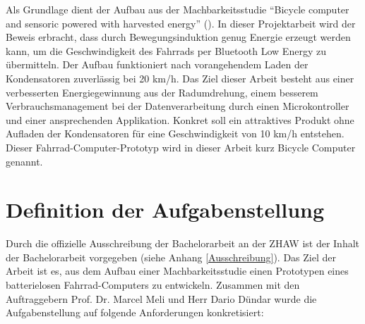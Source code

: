 Als Grundlage dient der Aufbau aus der Machbarkeitsstudie ``Bicycle computer and sensoric powered with harvested energy'' (\cite{PA_bicycle}). In dieser Projektarbeit wird der Beweis erbracht, dass durch Bewegungsinduktion genug Energie erzeugt werden kann, um die Geschwindigkeit des Fahrrads per Bluetooth Low Energy zu übermitteln. Der Aufbau funktioniert nach vorangehendem Laden der Kondensatoren zuverlässig bei 20 km/h. Das Ziel dieser Arbeit besteht aus einer verbesserten Energiegewinnung aus der Radumdrehung, einem besserem Verbrauchsmanagement bei der Datenverarbeitung durch einen Microkontroller und einer ansprechenden Applikation. Konkret soll ein attraktives Produkt ohne Aufladen der Kondensatoren für eine Geschwindigkeit von 10 km/h entstehen. Dieser Fahrrad-Computer-Prototyp wird in dieser Arbeit kurz Bicycle Computer genannt.



\section{Definition der Aufgabenstellung}\label{Aufgabenstellung} 

Durch die offizielle Ausschreibung der Bachelorarbeit an der ZHAW ist der Inhalt der Bachelorarbeit vorgegeben (siehe Anhang \ref{Ausschreibung}). Das Ziel der Arbeit ist es, aus dem Aufbau einer Machbarkeitsstudie einen Prototypen eines batterielosen Fahrrad-Computers zu entwickeln. Zusammen mit den Auftraggebern Prof. Dr. Marcel Meli und Herr Dario Dündar wurde die Aufgabenstellung auf folgende Anforderungen konkretisiert:

